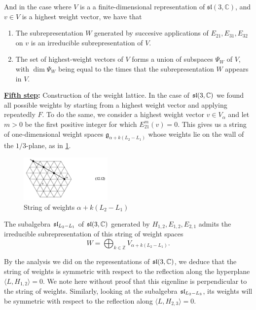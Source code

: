 \documentclass{report}
\begin{document}
And in the case where $V$ is a a finite-dimensional representation of $\mathfrak{sl}(3, \mathbb C)$, and $v \in V$ is a highest weight vector, we have that
\begin{enumerate}[label = (\roman*)]
    \item The subrepresentation $W$ generated by succesive applications of $E_{21}, E_{31}, E_{32}$ on $v$ is an irreducible subrepresentation of $V$.
    \item The set of highest-weight vectors of $V$ forms a union of subspaces $\Psi_W$ of $V$, with $\dim \Psi_W$ being equal to the times that the subrepresentation $W$ appears in $V$.
\end{enumerate}
\begin{center}
    
{\bf \underline{Fifth step}:} Construction of the weight lattice.
In the case of $\operatorname{{\mathfrak{sl}}}(3, \mathbb C)$ we found all possible weights by starting from a highest weight vector and applying repeatedly $F$.
To do the same, we consider a highest weight vector $v \in V_\alpha$ and let $m > 0$ be the first positive integer for which $E_{21}^m(v) = 0$.
This gives us a string of one-dimensional weight spaces $\mathfrak g_{\alpha + k (L_2 - L_1)}$ whose weights lie on the wall of the $1/3$-plane, as in \cref{fig:sl_3_C_string_of_weights}.
\begin{figure}[h]
    \centering
    \includegraphics[width=0.4\textwidth]{sl_3_C_string_of_weights.png}
    \caption{String of weights $\alpha + k(L_2 - L_1)$}
    \label{fig:sl_3_C_string_of_weights}
\end{figure}
The subalgebra $\operatorname{{\mathfrak{sl}}}_{L_2 - L_1}$ of $\operatorname{{\mathfrak{sl}}}(3, \mathbb C)$ generated by $H_{1,2}, E_{1,2}, E_{2,1}$ admits the irreducible subrepresentation of this string of weight spaces
\[
W = \bigoplus_{k \in \mathbb Z} V_{\alpha + k (L_2 - L_1)}.
\]
\end{center}
By the analysis we did on the representations of $\operatorname{{\mathfrak{sl}}}(3, \mathbb C)$, we deduce that the string of weights is symmetric with respect to the reflection along the hyperplane $\langle L, H_{1,2} \rangle = 0$.
We note here without proof that this eigenline is perpendicular to the string of weights.
Similarly, looking at the subalgebra $\operatorname{{\mathfrak{sl}}}_{L_2 - L_3}$, its weights will be symmetric with respect to the reflection along $\langle L, H_{2,3} \rangle = 0$.
\end{document}
